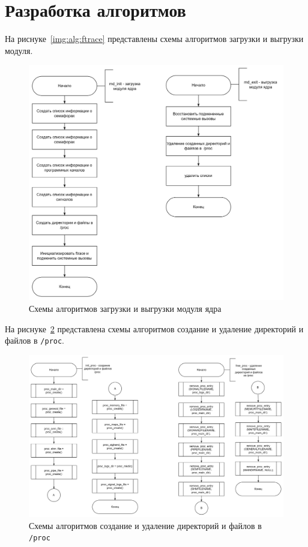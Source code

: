 \clearpage

\section{Разработка алгоритмов}

На риснуке~\ref{img:alg:ftrace} представлены схемы алгоритмов загрузки и выгрузки модуля.

\begin{figure}[h]
	\centering
	\includegraphics[height=0.6\textheight]{img/alg-md.png}
	\caption{Схемы алгоритмов загрузки и выгрузки модуля ядра}
	\label{img:alg:md}
\end{figure}

\clearpage

На риснуке~\ref{img:alg:proc} представлена схемы алгоритмов  создание и удаление директорий и файлов в \texttt{/proc}.

\begin{figure}[h]
	\centering
	\includegraphics[height=0.4\textheight]{img/alg-proc.png}
	\caption{Схемы алгоритмов создание и удаление директорий и файлов в \texttt{/proc}}
	\label{img:alg:proc}
\end{figure}

